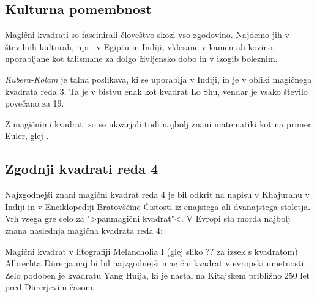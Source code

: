 \documentclass[a4paper,12pt]{article}
\begin{document}


\subsection{Kulturna pomembnost}

Magični kvadrati so fascinirali človeštvo skozi vso zgodovino. Najdemo jih
v številnih kulturah, npr.\ v Egiptu in Indiji, vklesane v kamen ali
kovino, uporabljane kot talismane za dolgo življensko dobo in v
izogib boleznim.

\emph{Kubera-Kolam} je talna poslikava, ki se uporablja v Indiji, in je v
obliki magičnega kvadrata reda 3. Ta je v bistvu enak kot kvadrat
Lo Shu, vendar je vsako število povečano za 19.


Z magičnimi kvadrati so se ukvarjali tudi najbolj znani matematiki kot na
primer Euler, glej \cite{euler}. %


\subsection{Zgodnji kvadrati reda 4}

Najzgodnejši znani magični kvadrat reda 4 je bil odkrit na napisu
v Khajurahu v Indiji in v Enciklopediji Bratovščine Čistosti iz enajstega
ali dvanajstega stoletja. Vrh vsega gre celo za ">panmagični kvadrat"<.
V Evropi sta morda najbolj znana naslednja magična kvadrata reda 4:

Magični kvadrat v litografiji Melancholia I (glej sliko ??
za izsek s kvadratom) Albrechta Dürerja naj bi bil najzgodnejši magični kvadrat
v evropski umetnosti. Zelo podoben je kvadratu Yang Huija, ki je nastal na Kitajskem
približno 250 let pred Dürerjevim časom. %
\end{document}
